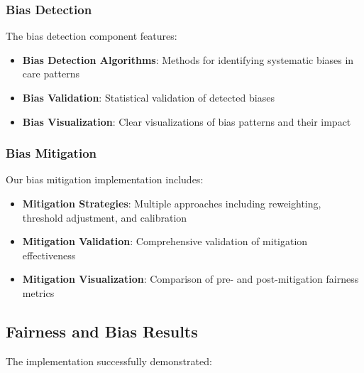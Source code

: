 \documentclass[12pt]{article}
\begin{document}
\subsubsection{Bias Detection}

The bias detection component features:
\begin{itemize}
    \item \textbf{Bias Detection Algorithms}: Methods for identifying systematic biases in care patterns
    \item \textbf{Bias Validation}: Statistical validation of detected biases
    \item \textbf{Bias Visualization}: Clear visualizations of bias patterns and their impact
\end{itemize}

\subsubsection{Bias Mitigation}

Our bias mitigation implementation includes:
\begin{itemize}
    \item \textbf{Mitigation Strategies}: Multiple approaches including reweighting, threshold adjustment, and calibration
    \item \textbf{Mitigation Validation}: Comprehensive validation of mitigation effectiveness
    \item \textbf{Mitigation Visualization}: Comparison of pre- and post-mitigation fairness metrics
\end{itemize}

\subsection{Fairness and Bias Results}

The implementation successfully demonstrated:
\end{document}
